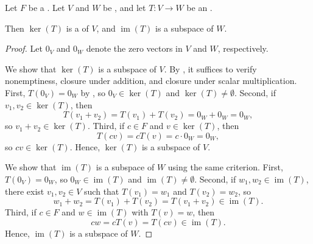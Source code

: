 \begin{proposition} \label{proposition:kernel_is_subspace_image_is_subspace_of_linear_maps}
    Let $F$ be a . Let $V$ and $W$ be , and let $T: V \to W$ be an .

    Then $\ker(T)$ is a  of $V$, and $\operatorname{im}(T)$ is a subspace of $W$.

\end{proposition}
\begin{proof}
    Let $0_V$ and $0_W$ denote the zero vectors in $V$ and $W$, respectively.

    We show that $\ker(T)$ is a subspace of $V$. By , it suffices to verify nonemptiness, closure under addition, and closure under scalar multiplication. First, $T(0_V) = 0_W$ by , so $0_V \in \ker(T)$ and $\ker(T) \neq \emptyset$. Second, if $v_1, v_2 \in \ker(T)$, then
    $$T(v_1 + v_2) = T(v_1) + T(v_2) = 0_W + 0_W = 0_W,$$
    so $v_1 + v_2 \in \ker(T)$. Third, if $c \in F$ and $v \in \ker(T)$, then
    $$T(cv) = cT(v) = c \cdot 0_W = 0_W,$$
    so $cv \in \ker(T)$. Hence, $\ker(T)$ is a subspace of $V$.

    We show that $\operatorname{im}(T)$ is a subspace of $W$ using the same criterion. First, $T(0_V) = 0_W$, so $0_W \in \operatorname{im}(T)$ and $\operatorname{im}(T) \neq \emptyset$. Second, if $w_1, w_2 \in \operatorname{im}(T)$, there exist $v_1, v_2 \in V$ such that $T(v_1) = w_1$ and $T(v_2) = w_2$, so
    $$w_1 + w_2 = T(v_1) + T(v_2) = T(v_1 + v_2) \in \operatorname{im}(T).$$
    Third, if $c \in F$ and $w \in \operatorname{im}(T)$ with $T(v) = w$, then
    $$cw = cT(v) = T(cv) \in \operatorname{im}(T).$$
    Hence, $\operatorname{im}(T)$ is a subspace of $W$.
\end{proof}
